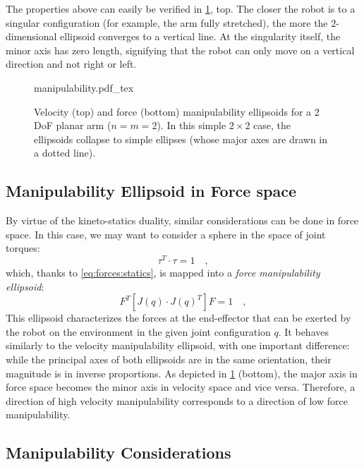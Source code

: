 The properties above can easily be verified in \cref{fig:manipulability}, top. The closer the robot is to a singular configuration (for example, the arm fully stretched), the more the $2$-dimensional ellipsoid converges to a vertical line. At the singularity itself, the minor axis has zero length, signifying that the robot can only move on a vertical direction and not right or left.

\begin{figure}[!t]
    \centering
    \def\svgwidth{0.8\textwidth}
    {manipulability.pdf_tex}
    \caption{Velocity (top) and force (bottom) manipulability ellipsoids for a 2 DoF planar arm ($n=m=2$). In this simple $2\times2$ case, the ellipsoids collapse to simple ellipses (whose major axes are drawn in a dotted line).  }\label{fig:manipulability}
\end{figure}

\subsection{Manipulability Ellipsoid in Force space}

By virtue of the kineto-statics duality, similar considerations can be done in force space. In this case, we may want to consider a sphere in the space of joint torques:
\begin{equation}
\tau^T\cdot\tau = 1 \quad ,  \label{eq:forces:manipulability:torquesphere}
\end{equation}
which, thanks to \cref{eq:forces:statics}, is mapped into a \textsl{force manipulability ellipsoid}:
\begin{equation}
F^T \left[ J(q) \cdot J(q)^T \right] F = 1 \quad ,
\label{eq:forces:manipulability:forcemanipulability}
\end{equation}
This ellipsoid characterizes the forces at the end-effector that can be exerted by the robot on the environment in the given joint configuration $q$. It behaves similarly to the velocity manipulability ellipsoid, with one important difference: while the principal axes of both ellipsoids are in the same orientation, their magnitude is in inverse proportions.
As depicted in \cref{fig:manipulability} (bottom), the major axis in force space becomes the minor axis in velocity space and vice versa.
Therefore, a direction of high velocity manipulability corresponds to a direction of low force manipulability.

\subsection{Manipulability Considerations}

